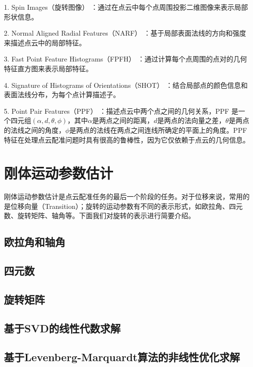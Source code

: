 1. Spin Images（旋转图像） \cite{johnson1997spin}：通过在点云中每个点周围投影二维图像来表示局部形状信息。

2. Normal Aligned Radial Features（NARF） \cite{steder2010narf}：基于局部表面法线的方向和强度来描述点云中的局部特征。

3. Fast Point Feature Histograms（FPFH） \cite{rusu2009fast}：通过计算每个点周围的点对的几何特征直方图来表示局部特征。

4. Signature of Histograms of Orientations（SHOT） \cite{salti2014shot}：结合局部点的颜色信息和表面法线分布，为每个点计算描述子。

5. Point Pair Features（PPF） \cite{deng2018ppfnet}：描述点云中两个点之间的几何关系，PPF 是一个四元组$(\alpha, d, \theta, \phi)$，其中$\alpha$是两点之间的距离，$d$是两点的法向量之差，$\theta$是两点的法线之间的角度，$\phi$是两点的法线在两点之间连线所确定的平面上的角度。PPF特征在处理点云配准问题时具有很高的鲁棒性，因为它仅依赖于点云的几何信息。

\section{刚体运动参数估计}
刚体运动参数估计是点云配准任务的最后一个阶段的任务。对于位移来说，常用的是位移向量（Transition）；旋转的运动参数有不同的表示形式，如欧拉角\cite{pio1966euler}、四元数\cite{shoemake1985animating}、旋转矩阵\cite{horn1954doubly}、轴角\cite{diebel2006representing}等。下面我们对旋转的表示进行简要介绍。

\subsection{欧拉角和轴角}

\subsection{四元数}

\subsection{旋转矩阵}


\subsection{基于SVD的线性代数求解}
\subsection{基于Levenberg-Marquardt算法的非线性优化求解}

